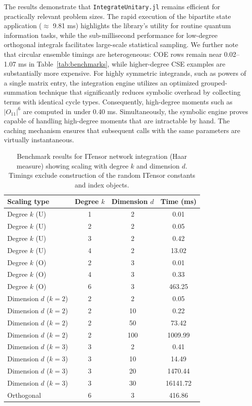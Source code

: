 \documentclass[manuscript,screen]{acmart}
\begin{document}
The results demonstrate that \texttt{IntegrateUnitary.jl} remains efficient for practically
relevant problem sizes. The rapid execution of the bipartite state application ($\approx$
9.81 ms) highlights the library's utility for routine quantum information tasks,
while the sub-millisecond performance for low-degree orthogonal integrals
facilitates large-scale statistical sampling. We further note that circular
ensemble timings are heterogeneous: COE rows remain near 0.02--1.07 ms in
Table~\ref{tab:benchmarks}, while higher-degree CSE examples are
substantially more expensive. For highly symmetric
integrands, such as powers of a single matrix entry, the integration engine
utilizes an optimized grouped-summation technique that significantly reduces
symbolic overhead by collecting terms with identical cycle types. Consequently,
high-degree moments such as $|O_{11}|^6$ are computed in under 0.40 ms.
Simultaneously, the symbolic engine proves capable of handling high-degree
moments that are intractable by hand. The caching mechanism ensures that
subsequent calls with the same parameters are virtually instantaneous.

\begin{table}[ht]
\centering
\caption{Benchmark results for ITensor network integration (Haar measure)
showing scaling with degree $k$ and dimension $d$. Timings exclude construction
of the random ITensor constants and index objects.}
\label{tab:itensor_benchmarks}
\begin{tabular}{lccc}
\hline
Scaling type & Degree $k$ & Dimension $d$ & Time (ms) \\
\hline
Degree $k$ (U) & 1 & 2 & 0.01 \\
Degree $k$ (U) & 2 & 2 & 0.05 \\
Degree $k$ (U) & 3 & 2 & 0.42 \\
Degree $k$ (U) & 4 & 2 & 13.02 \\
\hline
Degree $k$ (O) & 2 & 3 & 0.01 \\
Degree $k$ (O) & 4 & 3 & 0.33 \\
Degree $k$ (O) & 6 & 3 & 463.25 \\
\hline
Dimension $d$ ($k=2$) & 2 & 2 & 0.05 \\
Dimension $d$ ($k=2$) & 2 & 10 & 0.22 \\
Dimension $d$ ($k=2$) & 2 & 50 & 73.42 \\
Dimension $d$ ($k=2$) & 2 & 100 & 1009.99 \\
\hline
Dimension $d$ ($k=3$) & 3 & 2 & 0.41 \\
Dimension $d$ ($k=3$) & 3 & 10 & 14.49 \\
Dimension $d$ ($k=3$) & 3 & 20 & 1470.44 \\
Dimension $d$ ($k=3$) & 3 & 30 & 16141.72 \\
\hline
Orthogonal & 6 & 3 & 416.86 \\
\hline
\end{tabular}
\end{table}
\end{document}
